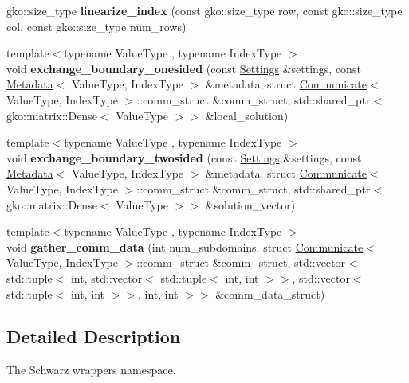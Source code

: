 \begin{DoxyCompactItemize}
\item 
\mbox{\label{namespaceSchwarzWrappers_a04eec9c45e6c8892a1f58f6e63bdb49e}} 
gko\+::size\+\_\+type {\bfseries linearize\+\_\+index} (const gko\+::size\+\_\+type row, const gko\+::size\+\_\+type col, const gko\+::size\+\_\+type num\+\_\+rows)
\item 
\mbox{\label{namespaceSchwarzWrappers_a641984e68102b3e16d20c78b94f5b92d}} 
{\footnotesize template$<$typename Value\+Type , typename Index\+Type $>$ }\\void {\bfseries exchange\+\_\+boundary\+\_\+onesided} (const \hyperlink{structSchwarzWrappers_1_1Settings}{Settings} \&settings, const \hyperlink{structSchwarzWrappers_1_1Metadata}{Metadata}$<$ Value\+Type, Index\+Type $>$ \&metadata, struct \hyperlink{classSchwarzWrappers_1_1Communicate}{Communicate}$<$ Value\+Type, Index\+Type $>$\+::comm\+\_\+struct \&comm\+\_\+struct, std\+::shared\+\_\+ptr$<$ gko\+::matrix\+::\+Dense$<$ Value\+Type $>$$>$ \&local\+\_\+solution)
\item 
\mbox{\label{namespaceSchwarzWrappers_ac82621175e8aa5923f753c0a31ea3a0e}} 
{\footnotesize template$<$typename Value\+Type , typename Index\+Type $>$ }\\void {\bfseries exchange\+\_\+boundary\+\_\+twosided} (const \hyperlink{structSchwarzWrappers_1_1Settings}{Settings} \&settings, const \hyperlink{structSchwarzWrappers_1_1Metadata}{Metadata}$<$ Value\+Type, Index\+Type $>$ \&metadata, struct \hyperlink{classSchwarzWrappers_1_1Communicate}{Communicate}$<$ Value\+Type, Index\+Type $>$\+::comm\+\_\+struct \&comm\+\_\+struct, std\+::shared\+\_\+ptr$<$ gko\+::matrix\+::\+Dense$<$ Value\+Type $>$$>$ \&solution\+\_\+vector)
\item 
\mbox{\label{namespaceSchwarzWrappers_ac3ea813e7def5dd435b215ff2a2dadaa}} 
{\footnotesize template$<$typename Value\+Type , typename Index\+Type $>$ }\\void {\bfseries gather\+\_\+comm\+\_\+data} (int num\+\_\+subdomains, struct \hyperlink{classSchwarzWrappers_1_1Communicate}{Communicate}$<$ Value\+Type, Index\+Type $>$\+::comm\+\_\+struct \&comm\+\_\+struct, std\+::vector$<$ std\+::tuple$<$ int, std\+::vector$<$ std\+::tuple$<$ int, int $>$$>$, std\+::vector$<$ std\+::tuple$<$ int, int $>$$>$, int, int $>$$>$ \&comm\+\_\+data\+\_\+struct)
\end{DoxyCompactItemize}


\subsection{Detailed Description}
The Schwarz wrappers namespace. 